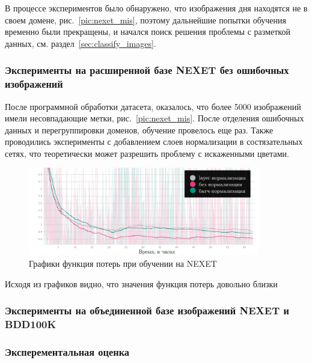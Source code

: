 \documentclass[11pt,a4paper]{extarticle}
\begin{document}
{				В процессе экспериментов было обнаружено, что изображения дня находятся не в своем домене, рис.~\ref{pic:nexet_mis}, поэтому дальнейшие попытки обучения временно были прекращены, и начался поиск решения проблемы с разметкой данных, см. раздел~\ref{sec:classify_images}.
				
			\subsubsection*{Эксперименты на расширенной базе NEXET без ошибочных изображений}\label{sec:tests:nexet_no_err}
				
				После программной обработки датасета, оказалось, что более 5000 изображений имели несовпадающие метки, рис.~\ref{pic:nexet_mis}.
				После отделения ошибочных данных и перегруппировки доменов, обучение провелось еще раз.
				Также проводились эксперименты с добавлением слоев нормализации в состязательных сетях, что теоретически может разрешить проблему с искаженными цветами.

				\begin{figure}[ht]
					\centering
					\includegraphics[width=0.9\textwidth]{img/loss_gen}
					\caption{Графики функция потерь при обучении на NEXET}
					\label{pic:loss_gen}
				\end{figure}
				
				\noindent
				Исходя из графиков видно, что значения функция потерь довольно близки 

			\subsubsection*{Эксперименты на объединенной базе изображений NEXET и BDD100K}\label{sec:tests:nexet_bdd}

		\subsubsection{Эксперементальная оценка}
			
			

}
\end{document}
